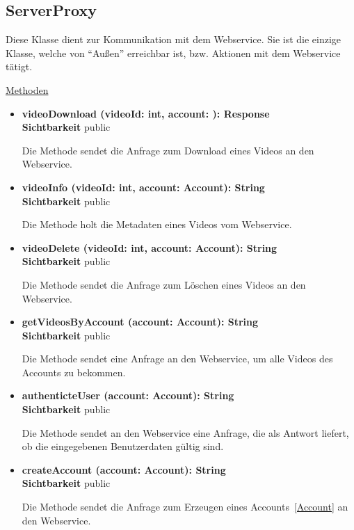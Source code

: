 \newpage
\subsection{ServerProxy}\label{ServerProxy}

Diese Klasse dient zur Kommunikation mit dem Webservice. Sie ist die einzige Klasse, welche von ``Außen'' erreichbar ist, bzw. Aktionen mit dem Webservice tätigt.

\underline{Methoden}
\begin{itemize}
\itemsep0pt

\item \textbf{videoDownload (videoId: int, account: ): Response}\hfill\\
\textbf{Sichtbarkeit} public

Die Methode sendet die Anfrage zum Download eines Videos an den Webservice.

\item \textbf{videoInfo (videoId: int, account: Account): String}\hfill\\
\textbf{Sichtbarkeit} public

Die Methode holt die Metadaten eines Videos vom Webservice.

\item \textbf{videoDelete (videoId: int, account: Account): String}\hfill\\
\textbf{Sichtbarkeit} public

Die Methode sendet die Anfrage zum Löschen eines Videos an den Webservice.

\item \textbf{getVideosByAccount (account: Account): String}\hfill\\
\textbf{Sichtbarkeit} public

Die Methode sendet eine Anfrage an den Webservice, um alle Videos des Accounts zu bekommen.

\item \textbf{authenticteUser (account: Account): String}\hfill\\
\textbf{Sichtbarkeit} public

Die Methode sendet an den Webservice eine Anfrage, die als Antwort liefert, ob die eingegebenen Benutzerdaten gültig sind.

\item \textbf{createAccount (account: Account): String}\hfill\\
\textbf{Sichtbarkeit} public

Die Methode sendet die Anfrage zum Erzeugen eines Accounts~\eqref{Account} an den Webservice.


\end{itemize}

